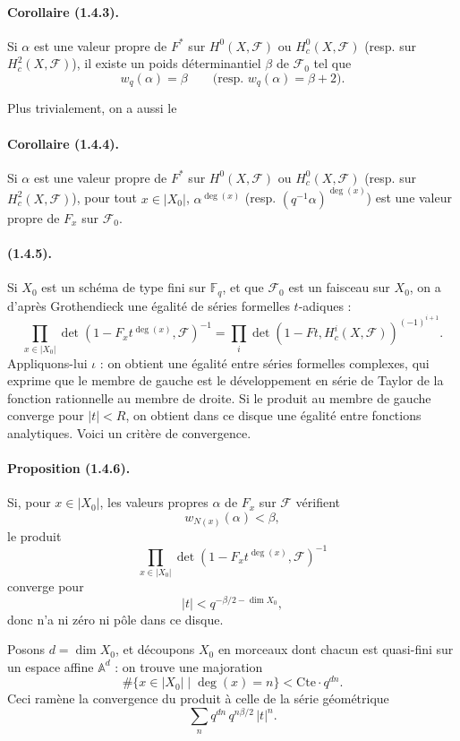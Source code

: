 \documentclass[11pt]{article}
\theoremstyle{remark}
\newcommand{\Fq}{\mathbb{F}_q}
\begin{document}
\paragraph{Corollaire (1.4.3).} Si $\alpha$ est une valeur propre de $F^*$ sur $H^0(X,\mathcal F)$ ou $H^0_c(X,\mathcal F)$ (resp. sur $H^2_c(X,\mathcal F)$), il existe un poids déterminantiel $\beta$ de $\mathcal F_0$ tel que
\[
w_q(\alpha)=\beta \qquad \text{(resp. } w_q(\alpha)=\beta+2\text{)}.
\]

Plus trivialement, on a aussi le

\paragraph{Corollaire (1.4.4).} Si $\alpha$ est une valeur propre de $F^*$ sur $H^0(X,\mathcal F)$ ou $H^0_c(X,\mathcal F)$ (resp. sur $H^2_c(X,\mathcal F)$), pour tout $x\in |X_0|$, $\alpha^{\deg(x)}$ (resp. $(q^{-1}\alpha)^{\deg(x)}$) est une valeur propre de $F_x$ sur $\mathcal F_0$.

\paragraph{(1.4.5).} Si $X_0$ est un schéma de type fini sur $\Fq$, et que $\mathcal F_0$ est un faisceau sur $X_0$, on a d'après Grothendieck une égalité de séries formelles $t$-adiques :
\begin{equation}\tag{1.4.5.1}
\prod_{x\in |X_0|}\det(1-F_x t^{\deg(x)},\mathcal F)^{-1}
=
\prod_i\det(1-Ft,H^i_c(X,\mathcal F))^{(-1)^{i+1}}.
\end{equation}
Appliquons-lui $\iota$ : on obtient une égalité entre séries formelles complexes, qui exprime que le membre de gauche est le développement en série de Taylor de la fonction rationnelle au membre de droite. Si le produit au membre de gauche converge pour $|t|<R$, on obtient dans ce disque une égalité entre fonctions analytiques. Voici un critère de convergence.

\paragraph{Proposition (1.4.6).} Si, pour $x\in |X_0|$, les valeurs propres $\alpha$ de $F_x$ sur $\mathcal F$ vérifient
\[
w_{N(x)}(\alpha)<\beta,
\]
le produit
\[
\prod_{x\in |X_0|}\det(1-F_x t^{\deg(x)},\mathcal F)^{-1}
\]
converge pour
\[
|t|<q^{-\beta/2-\dim X_0},
\]
donc n'a ni zéro ni pôle dans ce disque.

Posons $d=\dim X_0$, et découpons $X_0$ en morceaux dont chacun est quasi-fini sur un espace affine $\mathbb A^d$ : on trouve une majoration
\[
\#\{x\in |X_0|\mid \deg(x)=n\}<\mathrm{Cte}\cdot q^{dn}.
\]
Ceci ramène la convergence du produit à celle de la série géométrique
\[
\sum_n q^{dn}\,q^{n\beta/2}\,|t|^n.
\]
\end{document}

